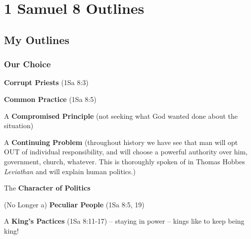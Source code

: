 \section{1 Samuel 8 Outlines}

\subsection{My Outlines}

\subsubsection{Our Choice}
\begin{compactenum}[I.]
    \item \textbf{Corrupt Priests} (1Sa 8:3) 
    \item \textbf{Common Practice} (1Sa 8:5) 
    \item A \textbf{Compromised Principle} (not seeking what God wanted done about the situation)%
    \item A \textbf{Continuing Problem} (throughout history we have see that man will opt OUT of individual responsibility, and will choose a powerful authority over him, government, church, whatever. This is thoroughly spoken of in Thomas Hobbes \emph{Leviathan} and will explain human politics.)%
    \item The \textbf{Character of Politics} %
    \item (No Longer a) \textbf{Peculiar People} (1Sa 8:5, 19) 
    \item A \textbf{King's Pactices} (1Sa 8:11-17) -- staying in power -- kings like to keep being king!
\end{compactenum}
